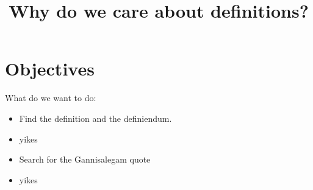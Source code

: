\documentclass{beamer}
\begin{document}
\section{Objectives}
\begin{frame}
What do we want to do:
\begin{itemize}
\item Find the definition and the definiendum.
\item yikes 
\end{itemize}
\end{frame}

\begin{frame}
\title{Why do we care about definitions?}
\begin{itemize}
\item Search for the Gannisalegam quote
\item yikes
\end{itemize}
\end{frame}
\end{document}
